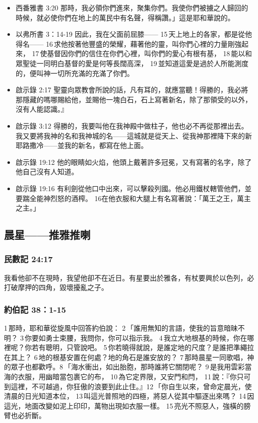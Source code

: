 \begin{itemize}
\item 西番雅書 3:20
那時，我必領你們進來，聚集你們。我使你們被擄之人歸回的時候，就必使你們在地上的萬民中有名聲，得稱讚。」這是耶和華說的。
\item 以弗所書 3：14-19
因此，我在父面前屈膝—— 15 天上地上的各家，都是從他得名—— 16 求他按著他豐盛的榮耀，藉著他的靈，叫你們心裡的力量剛強起來， 17 使基督因你們的信住在你們心裡，叫你們的愛心有根有基， 18 能以和眾聖徒一同明白基督的愛是何等長闊高深， 19 並知道這愛是過於人所能測度的，便叫神一切所充滿的充滿了你們。
\item 啟示錄 2:17
聖靈向眾教會所說的話，凡有耳的，就應當聽！得勝的，我必將那隱藏的嗎哪賜給他，並賜他一塊白石，石上寫著新名，除了那領受的以外，沒有人能認識。』
\item 啟示錄 3:12
得勝的，我要叫他在我神殿中做柱子，他也必不再從那裡出去。我又要將我神的名和我神城的名——這城就是從天上、從我神那裡降下來的新耶路撒冷——並我的新名，都寫在他上面。
\item 啟示錄 19:12
他的眼睛如火焰，他頭上戴著許多冠冕，又有寫著的名字，除了他自己沒有人知道。
\item 啟示錄 19:16
有利劍從他口中出來，可以擊殺列國。他必用鐵杖轄管他們，並要踹全能神烈怒的酒榨。 16在他衣服和大腿上有名寫著說：「萬王之王，萬主之主。」
\end{itemize} 




\subsection{晨星——推雅推喇}

\subsubsection{民數記 24:17}
我看他卻不在現時，我望他卻不在近日。有星要出於雅各，有杖要興於以色列，必打破摩押的四角，毀壞擾亂之子。

\subsubsection{約伯記 38：1-15}
1 那時，耶和華從旋風中回答約伯說： 2 「誰用無知的言語，使我的旨意暗昧不明？ 3 你要如勇士束腰，我問你，你可以指示我。 4 我立大地根基的時候，你在哪裡呢？你若有聰明，只管說吧。 5 你若曉得就說，是誰定地的尺度？是誰把準繩拉在其上？ 6 地的根基安置在何處？地的角石是誰安放的？ 7 那時晨星一同歌唱，神的眾子也都歡呼。8 「海水衝出，如出胎胞，那時誰將它關閉呢？ 9 是我用雲彩當海的衣服，用幽暗當包裹它的布， 10 為它定界限，又安門和閂， 11 說：『你只可到這裡，不可越過，你狂傲的浪要到此止住。』12 「你自生以來，曾命定晨光，使清晨的日光知道本位， 13 叫這光普照地的四極，將惡人從其中驅逐出來嗎？ 14 因這光，地面改變如泥上印印，萬物出現如衣服一樣。 15 亮光不照惡人，強橫的膀臂也必折斷。


